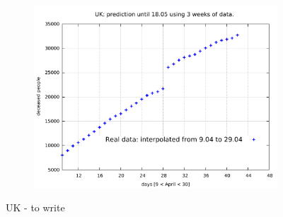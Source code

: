\documentclass[8pt]{article}
\begin{document}
\begin{figure}[h!]
\begin{subfigure}[b]{0.45\linewidth}
  \includegraphics[width=\linewidth]{../tuned/uk/9-29/9-29.pdf}
  \end{subfigure}
	\caption{UK - to write}
\end{figure}
\end{document}
